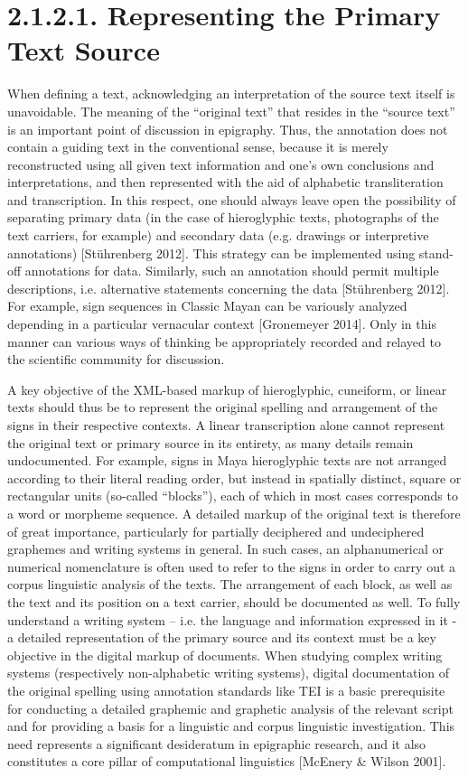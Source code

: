 \documentclass[amsthm,ebook]{saparticle}
\begin{document}
\bigskip

\section[2.1.2.1. Representing the Primary Text Source]{2.1.2.1. Representing the Primary Text Source}
When defining a text, acknowledging an interpretation of the source text itself is unavoidable. The meaning of the
“original text” that resides in the “source text” is an important point of discussion in epigraphy. Thus, the
annotation does not contain a guiding text in the conventional sense, because it is merely reconstructed using all
given text information and one’s own conclusions and interpretations, and then represented with the aid of alphabetic
transliteration and transcription. In this respect, one should always leave open the possibility of separating primary
data (in the case of hieroglyphic texts, photographs of the text carriers, for example) and secondary data (e.g.
drawings or interpretive annotations) [Stührenberg 2012]. This strategy can be implemented using stand-off annotations
for data. Similarly, such an annotation should permit multiple descriptions, i.e. alternative statements concerning the
data [Stührenberg 2012]. For example, sign sequences in Classic Mayan can be variously analyzed depending in a
particular vernacular context [Gronemeyer 2014]. Only in this manner can various ways of thinking be appropriately
recorded and relayed to the scientific community for discussion. 

A key objective of the XML-based markup of hieroglyphic, cuneiform, or linear texts should thus be to represent the
original spelling and arrangement of the signs in their respective contexts. A linear transcription alone cannot
represent the original text or primary source in its entirety, as many details remain undocumented. For example, signs
in Maya hieroglyphic texts are not arranged according to their literal reading order, but instead in spatially
distinct, square or rectangular units (so-called “blocks”), each of which in most cases corresponds to a word or
morpheme sequence. A detailed markup of the original text is therefore of great importance, particularly for partially
deciphered and undeciphered graphemes and writing systems in general. In such cases, an alphanumerical or numerical
nomenclature is often used to refer to the signs in order to carry out a corpus linguistic analysis of the texts. The
arrangement of each block, as well as the text and its position on a text carrier, should be documented as well. To
fully understand a writing system – i.e. the language and information expressed in it - a detailed representation of
the primary source and its context must be a key objective in the digital markup of documents. When studying complex
writing systems (respectively non-alphabetic writing systems), digital documentation of the original spelling using
annotation standards like TEI is a basic prerequisite for conducting a detailed graphemic and graphetic analysis of the
relevant script and for providing a basis for a linguistic and corpus linguistic investigation. This need represents a
significant desideratum in epigraphic research, and it also constitutes a core pillar of computational linguistics
[McEnery \& Wilson 2001]. 
\end{document}

